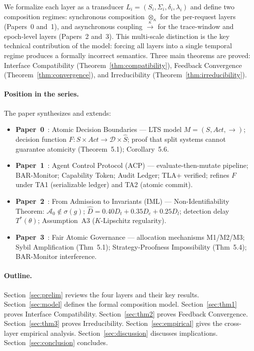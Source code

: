 \documentclass[11pt]{article}
\newcommand{\Dec}{\mathcal{D}}
\newcommand{\Dhat}{\widehat{D}}
\newcommand{\Azero}{\mathcal{A}_0}
\newcommand{\Layer}[1]{L_{#1}}
\newcommand{\State}[1]{S_{#1}}
\newcommand{\Trans}[1]{\delta_{#1}}
\newcommand{\Sum}[1]{\lambda_{#1}}
\newcommand{\Comp}{\otimes_\kappa}
\newcommand{\AsyncComp}{\xrightarrow{\kappa}}
\begin{document}
We formalize each layer as a transducer $\Layer{i} = (\State{i}, \Sigma_i,
\Trans{i}, \Sum{i})$ and define two composition regimes: synchronous
composition $\Comp$ for the per-request layers (Papers~0 and~1), and
asynchronous coupling $\AsyncComp$ for the trace-window and epoch-level
layers (Papers~2 and~3). This multi-scale distinction is the key technical
contribution of the model: forcing all layers into a single temporal regime
produces a formally incorrect semantics. Three main theorems are proved:
Interface Compatibility (Theorem~\ref{thm:compatibility}), Feedback
Convergence (Theorem~\ref{thm:convergence}), and Irreducibility
(Theorem~\ref{thm:irreducibility}).

\paragraph{Position in the series.}
The paper synthesizes and extends:
\begin{itemize}[noitemsep]
  \item \textbf{Paper~0}~\cite{fernandez2026a}: Atomic Decision Boundaries ---
    LTS model $M = (S, \mathit{Act}, \to)$; decision function
    $F: S \times \mathit{Act} \to \Dec \times \hat{S}$; proof that split
    systems cannot guarantee atomicity (Theorem~5.1); Corollary~5.6.
  \item \textbf{Paper~1}~\cite{fernandez2026b}: Agent Control Protocol (ACP)
    --- evaluate-then-mutate pipeline; BAR-Monitor; Capability Token; Audit
    Ledger; TLA+ verified; refines $F$ under TA1 (serializable ledger) and
    TA2 (atomic commit).
  \item \textbf{Paper~2}~\cite{fernandez2026c}: From Admission to Invariants
    (IML) --- Non-Identifiability Theorem: $\Azero \notin \sigma(g)$;
    $\Dhat = 0.40 D_t + 0.35 D_c + 0.25 D_l$; detection delay $T^*(\theta)$;
    Assumption~A3 ($K$-Lipschitz regularity).
  \item \textbf{Paper~3}~\cite{fairgov26}: Fair Atomic Governance ---
    allocation mechanisms M1/M2/M3; Sybil Amplification (Thm~5.1);
    Strategy-Proofness Impossibility (Thm~5.4); BAR-Monitor interference.
\end{itemize}

\paragraph{Outline.}
Section~\ref{sec:prelim} reviews the four layers and their key results.
Section~\ref{sec:model} defines the formal composition model.
Section~\ref{sec:thm1} proves Interface Compatibility.
Section~\ref{sec:thm2} proves Feedback Convergence.
Section~\ref{sec:thm3} proves Irreducibility.
Section~\ref{sec:empirical} gives the cross-layer empirical analysis.
Section~\ref{sec:discussion} discusses implications.
Section~\ref{sec:conclusion} concludes.
\end{document}
